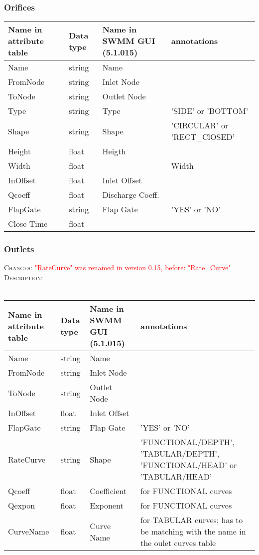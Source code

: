 \documentclass[10pt,a4paper,oneside]{scrbook}
\begin{document}
\subsubsection{Orifices}
\begin{tabular}{p{1.7cm}|p{1.3cm}|P{3cm}|P{8cm}}
\hline 
\textbf{Name in attribute table} & \textbf{Data type} & \textbf{Name in SWMM GUI (5.1.015)} & \textbf{annotations}\\ 
\hline 
Name & string & Name & \\
FromNode & string & Inlet Node & \\ 
ToNode & string & Outlet Node&  \\ 
Type & string & Type & 'SIDE' or 'BOTTOM'\\
Shape & string & Shape & 'CIRCULAR' or 'RECT\_ClOSED'\\
Height & float & Heigth & \\
Width & float &  & Width \\
InOffset & float & Inlet Offset & \\
Qcoeff & float & Discharge Coeff. & \\
FlapGate & string & Flap Gate & 'YES' or 'NO'\\
Close Time & float &  & \\
\hline
\end{tabular}

\subsubsection{Outlets}
\textsc{Changes}: \textcolor{red}{"RateCurve" was renamed in version 0.15, before: "Rate\_Curve"} \\
\textsc{Description}: \\
\\
\begin{tabular}{p{2cm}|p{1.3cm}|P{3cm}|P{7.7cm}}
\hline 
\textbf{Name in attribute table} & \textbf{Data type} & \textbf{Name in SWMM GUI (5.1.015)} & \textbf{annotations}\\ 
\hline 
Name & string & Name & \\
FromNode & string & Inlet Node & \\ 
ToNode & string & Outlet Node&  \\ 
InOffset & float & Inlet Offset & \\
FlapGate & string & Flap Gate & 'YES' or 'NO'\\
RateCurve & string & Shape & 'FUNCTIONAL/DEPTH', 'TABULAR/DEPTH', 'FUNCTIONAL/HEAD' or 'TABULAR/HEAD' \\
Qcoeff & float & Coefficient & for FUNCTIONAL curves\\
Qexpon & float & Exponent & for FUNCTIONAL curves\\
CurveName & float & Curve Name & for TABULAR curves; has to be matching with the name in the oulet curves table\\
\hline
\end{tabular}
\end{document}
